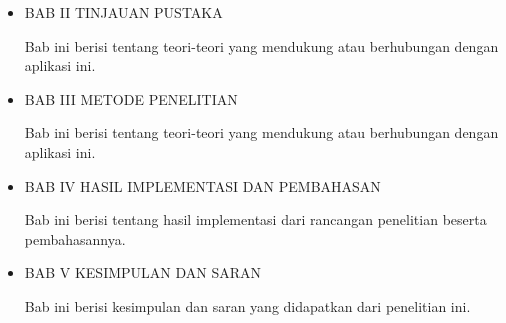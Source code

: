 \begin{flushleft}
\begin{itemize}
  \item \noindent BAB II TINJAUAN PUSTAKA
  \begin{justify}
    Bab ini berisi tentang teori-teori yang mendukung atau berhubungan dengan aplikasi ini.

  \end{justify}
\end{itemize}

\begin{itemize}
  \item \noindent BAB III METODE PENELITIAN
  \begin{justify}
    Bab ini berisi tentang teori-teori yang mendukung atau berhubungan dengan aplikasi ini.

  \end{justify}
\end{itemize}


\begin{itemize}
  \item \noindent BAB IV HASIL IMPLEMENTASI DAN PEMBAHASAN
  \begin{justify}
    Bab ini berisi tentang hasil implementasi dari rancangan penelitian beserta pembahasannya.

  \end{justify}
\end{itemize}


\begin{itemize}
  \item \noindent BAB V KESIMPULAN DAN SARAN
  \begin{justify}
    Bab ini berisi kesimpulan dan saran yang didapatkan dari penelitian ini.

  \end{justify}
\end{itemize}



\end{flushleft}



\newpage